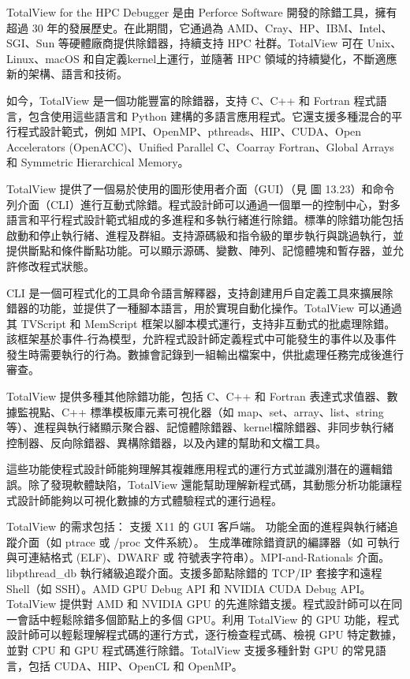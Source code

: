 TotalView for the HPC Debugger 是由 Perforce Software 開發的除錯工具，擁有超過 30 年的發展歷史。在此期間，它通過為 AMD、Cray、HP、IBM、Intel、SGI、Sun 等硬體廠商提供除錯器，持續支持 HPC 社群。TotalView 可在 Unix、Linux、macOS 和自定義kernel上運行，並隨著 HPC 領域的持續變化，不斷適應新的架構、語言和技術。

如今，TotalView 是一個功能豐富的除錯器，支持 C、C++ 和 Fortran 程式語言，包含使用這些語言和 Python 建構的多語言應用程式。它還支援多種混合的平行程式設計範式，例如 MPI、OpenMP、pthreads、HIP、CUDA、Open Accelerators (OpenACC)、Unified Parallel C、Coarray Fortran、Global Arrays 和 Symmetric Hierarchical Memory。

TotalView 提供了一個易於使用的圖形使用者介面（GUI）（見 圖 13.23）和命令列介面（CLI）進行互動式除錯。程式設計師可以通過一個單一的控制中心，對多語言和平行程式設計範式組成的多進程和多執行緒進行除錯。標準的除錯功能包括啟動和停止執行緒、進程及群組。支持源碼級和指令級的單步執行與跳過執行，並提供斷點和條件斷點功能。可以顯示源碼、變數、陣列、記憶體塊和暫存器，並允許修改程式狀態。

CLI 是一個可程式化的工具命令語言解釋器，支持創建用戶自定義工具來擴展除錯器的功能，並提供了一種腳本語言，用於實現自動化操作。TotalView 可以通過其 TVScript 和 MemScript 框架以腳本模式運行，支持非互動式的批處理除錯。該框架基於事件-行為模型，允許程式設計師定義程式中可能發生的事件以及事件發生時需要執行的行為。數據會記錄到一組輸出檔案中，供批處理任務完成後進行審查。


TotalView 提供多種其他除錯功能，包括 C、C++ 和 Fortran 表達式求值器、數據監視點、C++ 標準模板庫元素可視化器（如 map、set、array、list、string 等）、進程與執行緒顯示聚合器、記憶體除錯器、kernel檔除錯器、非同步執行緒控制器、反向除錯器、異構除錯器，以及內建的幫助和文檔工具。

這些功能使程式設計師能夠理解其複雜應用程式的運行方式並識別潛在的邏輯錯誤。除了發現軟體缺陷，TotalView 還能幫助理解新程式碼，其動態分析功能讓程式設計師能夠以可視化數據的方式體驗程式的運行過程。

TotalView 的需求包括：
支援 X11 的 GUI 客戶端。
功能全面的進程與執行緒追蹤介面（如 ptrace 或 /proc 文件系統）。
生成準確除錯資訊的編譯器（如 可執行與可連結格式 (ELF)、DWARF 或 符號表字符串）。MPI-and-Rationals 介面。libpthread\_db 執行緒級追蹤介面。支援多節點除錯的 TCP/IP 套接字和遠程 Shell（如 SSH）。AMD GPU Debug API 和 NVIDIA CUDA Debug API。
TotalView 提供對 AMD 和 NVIDIA GPU 的先進除錯支援。程式設計師可以在同一會話中輕鬆除錯多個節點上的多個 GPU。利用 TotalView 的 GPU 功能，程式設計師可以輕鬆理解程式碼的運行方式，逐行檢查程式碼、檢視 GPU 特定數據，並對 CPU 和 GPU 程式碼進行除錯。TotalView 支援多種針對 GPU 的常見語言，包括 CUDA、HIP、OpenCL 和 OpenMP。


